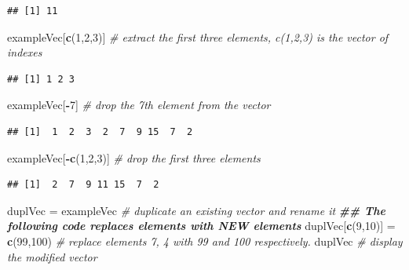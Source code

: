 \documentclass[
]{book}
\newenvironment{Shaded}{\begin{snugshade}}{\end{snugshade}}
\newcommand{\CommentTok}[1]{\textcolor[rgb]{0.56,0.35,0.01}{\textit{#1}}}
\newcommand{\DecValTok}[1]{\textcolor[rgb]{0.00,0.00,0.81}{#1}}
\newcommand{\DocumentationTok}[1]{\textcolor[rgb]{0.56,0.35,0.01}{\textbf{\textit{#1}}}}
\newcommand{\FunctionTok}[1]{\textcolor[rgb]{0.13,0.29,0.53}{\textbf{#1}}}
\newcommand{\NormalTok}[1]{#1}
\newcommand{\OtherTok}[1]{\textcolor[rgb]{0.56,0.35,0.01}{#1}}
\newcommand{\SpecialCharTok}[1]{\textcolor[rgb]{0.81,0.36,0.00}{\textbf{#1}}}
\begin{document}
\begin{verbatim}
## [1] 11
\end{verbatim}

\begin{Shaded}
\begin{Highlighting}[]
\NormalTok{exampleVec[}\FunctionTok{c}\NormalTok{(}\DecValTok{1}\NormalTok{,}\DecValTok{2}\NormalTok{,}\DecValTok{3}\NormalTok{)]     }\CommentTok{\# extract the first three elements, c(1,2,3) is the vector of indexes}
\end{Highlighting}
\end{Shaded}

\begin{verbatim}
## [1] 1 2 3
\end{verbatim}

\begin{Shaded}
\begin{Highlighting}[]
\NormalTok{exampleVec[}\SpecialCharTok{{-}}\DecValTok{7}\NormalTok{]           }\CommentTok{\# drop the 7th element from the vector}
\end{Highlighting}
\end{Shaded}

\begin{verbatim}
## [1]  1  2  3  2  7  9 15  7  2
\end{verbatim}

\begin{Shaded}
\begin{Highlighting}[]
\NormalTok{exampleVec[}\SpecialCharTok{{-}}\FunctionTok{c}\NormalTok{(}\DecValTok{1}\NormalTok{,}\DecValTok{2}\NormalTok{,}\DecValTok{3}\NormalTok{)]    }\CommentTok{\# drop the first three elements}
\end{Highlighting}
\end{Shaded}

\begin{verbatim}
## [1]  2  7  9 11 15  7  2
\end{verbatim}

\begin{Shaded}
\begin{Highlighting}[]
\NormalTok{duplVec }\OtherTok{=}\NormalTok{ exampleVec     }\CommentTok{\# duplicate an existing vector and rename it}
\DocumentationTok{\#\# The following code replaces elements with NEW elements}
\NormalTok{duplVec[}\FunctionTok{c}\NormalTok{(}\DecValTok{9}\NormalTok{,}\DecValTok{10}\NormalTok{)] }\OtherTok{=} \FunctionTok{c}\NormalTok{(}\DecValTok{99}\NormalTok{,}\DecValTok{100}\NormalTok{)   }\CommentTok{\# replace elements 7, 4 with 99 and 100 respectively.}
\NormalTok{duplVec                  }\CommentTok{\# display the modified vector}
\end{Highlighting}
\end{Shaded}
\end{document}
